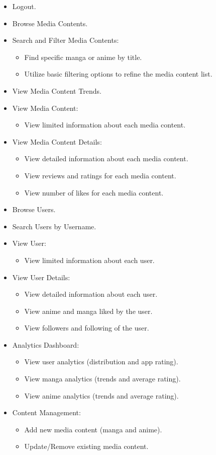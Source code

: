 \begin{itemize}
    \item Logout.
    \item Browse Media Contents.
    \item Search and Filter Media Contents:
    \begin{itemize}
        \item Find specific manga or anime by title.
        \item Utilize basic filtering options to refine the media content list.
    \end{itemize}
    \item View Media Content Trends.
    \item View Media Content:
    \begin{itemize}
        \item View limited information about each media content.
    \end{itemize} 
    \item View Media Content Details:
    \begin{itemize}
        \item View detailed information about each media content.
        \item View reviews and ratings for each media content.
        \item View number of likes for each media content.
    \end{itemize}
    \item Browse Users.
    \item Search Users by Username.
    \item View User:
    \begin{itemize}
        \item View limited information about each user.
    \end{itemize} 
    \item View User Details:
    \begin{itemize}
        \item View detailed information about each user.
        \item View anime and manga liked by the user.
        \item View followers and following of the user.
    \end{itemize}
    \item Analytics Dashboard:
    \begin{itemize}
        \item View user analytics (distribution and app rating).
        \item View manga analytics (trends and average rating).
        \item View anime analytics (trends and average rating).
    \end{itemize}
   
    \item Content Management:
    \begin{itemize}
        \item Add new media content (manga and anime).
        \item Update/Remove existing media content.
    \end{itemize}
\end{itemize}

